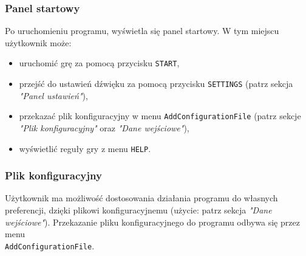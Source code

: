 \documentclass[a4paper]{article}
\begin{document}
\subsubsection{Panel startowy}
\quad Po uruchomieniu programu, wy\'swietla si\k{e} panel startowy. W tym miejscu u\.zytkownik mo\.ze:
\begin{itemize}
    \item uruchomi\'c gr\k{e} za pomoc\k{a} przycisku \texttt{START},
    \item przej\'s\'c do ustawie\'n d\'zwi\k{e}ku za pomoc\k{a} przycisku \texttt{SETTINGS} (patrz sekcja \textit{"Panel ustawie\'n"}),
    \item przekaza\'c plik konfiguracyjny w menu \texttt{AddConfigurationFile} (patrz sekcje \textit{"Plik konfiguracyjny"} oraz \textit{"Dane wej\'sciowe"}),
    \item wy\'swietli\'c regu\l{}y gry z menu \texttt{HELP}.
\end{itemize}

\subsubsection{Plik konfiguracyjny}
\quad U\.zytkownik ma mo\.zliwo\'s\'c dostosowania dzia\l{}ania programu do w\l{}asnych preferencji, dzi\k{e}ki plikowi konfiguracyjnemu (u\.zycie: patrz sekcja \textit{"Dane wej\'sciowe"}).
Przekazanie pliku konfiguracyjnego do programu odbywa si\k{e} przez menu \\ \texttt{AddConfigurationFile}.
\end{document}
